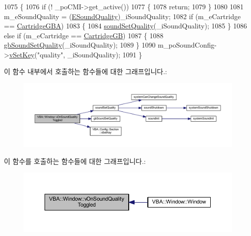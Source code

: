 \begin{DoxyCode}
1075 \{
1076   \textcolor{keywordflow}{if} (! \_poCMI->get\_active())
1077   \{
1078     \textcolor{keywordflow}{return};
1079   \}
1080 
1081   m\_eSoundQuality = (\mbox{\hyperlink{class_v_b_a_1_1_window_a320f2aa064d602888b12cdd2ebfbb3c8}{ESoundQuality}})\_iSoundQuality;
1082   \textcolor{keywordflow}{if} (m\_eCartridge == \mbox{\hyperlink{class_v_b_a_1_1_window_af580451d3ee7a738a73434858a08fa65a64f96d20685b8bd757b1996f9d0cd906}{CartridgeGBA}})
1083   \{
1084     \mbox{\hyperlink{_sound_8cpp_a46bef5048521e8000f3850e686e7eb22}{soundSetQuality}}(\_iSoundQuality);
1085   \}
1086   \textcolor{keywordflow}{else} \textcolor{keywordflow}{if} (m\_eCartridge == \mbox{\hyperlink{class_v_b_a_1_1_window_af580451d3ee7a738a73434858a08fa65a23a8d7e61dfcb4c1935477f7b9b80067}{CartridgeGB}})
1087   \{
1088     \mbox{\hyperlink{_g_b_8h_a86ed9a5e6bb5230a501d753280690618}{gbSoundSetQuality}}(\_iSoundQuality);
1089   \}
1090   m\_poSoundConfig->\mbox{\hyperlink{class_v_b_a_1_1_config_1_1_section_a57e1b95cbea40db71c093381beff4b0e}{vSetKey}}(\textcolor{stringliteral}{"quality"}, \_iSoundQuality);
1091 \}
\end{DoxyCode}
이 함수 내부에서 호출하는 함수들에 대한 그래프입니다.\+:
\nopagebreak
\begin{figure}[H]
\begin{center}
\leavevmode
\includegraphics[width=350pt]{class_v_b_a_1_1_window_ae0ea496e382a463114dab0895698fed7_cgraph}
\end{center}
\end{figure}
이 함수를 호출하는 함수들에 대한 그래프입니다.\+:
\nopagebreak
\begin{figure}[H]
\begin{center}
\leavevmode
\includegraphics[width=350pt]{class_v_b_a_1_1_window_ae0ea496e382a463114dab0895698fed7_icgraph}
\end{center}
\end{figure}
\mbox{\label{class_v_b_a_1_1_window_a1b7f801dd8f6c48c9161314e4ed266ed}} 
